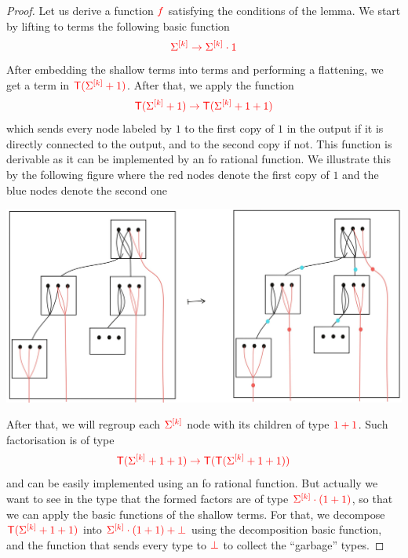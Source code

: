 \begin{proof}
Let us derive a function ${\color{red}{f}}$ satisfying the conditions of the lemma. We start by lifting to terms the following basic function 
\begin{align*}
{\color{red}{\Sigma^{{\color{red}{[k]}}}  \to \Sigma^{{\color{red}{[k]}}} \cdot1}}
\end{align*}
After embedding the shallow terms into terms and performing a flattening, we get a term in ${\color{red}{{\color{red}{\mathsf T}}(\Sigma^{{\color{red}{[k]}}}+1)}}$. After that, we apply the function
\begin{align*}
{\color{red}{{\color{red}{\mathsf T}}(\Sigma^{{\color{red}{[k]}}}+1)\to {\color{red}{\mathsf T}}(\Sigma^{{\color{red}{[k]}}}+1+1)}}
\end{align*}
which sends every node labeled by $1$ to the first copy of $1$ in the output if it is directly connected to the output, and to the second copy if not. This function is derivable as it can be implemented by an fo rational function. We illustrate this by the following figure where the red nodes denote the first copy of $1$ and the blue nodes denote the second one
\begin{center}
\includegraphics[scale=.1]{MyPicLabel1.jpg}
\end{center}  
After that, we will regroup each ${\color{red}{\Sigma^{{\color{red}{[k]}}}}}$ node with its children of type ${\color{red}{1+1}}$. Such factorisation is of type
\begin{align*}
{\color{red}{{\color{red}{\mathsf T}}(\Sigma^{{\color{red}{[k]}}}+1+1)\to {\color{red}{\mathsf T}}({\color{red}{\mathsf T}}(\Sigma^{{\color{red}{[k]}}}+1+1))}}
\end{align*} 
and can be easily implemented using an fo rational function.
But actually we want to see in the type that the formed factors are of type ${\color{red}{\Sigma^{{\color{red}{[k]}}}\cdot(1+1)}}$, so that we can apply the basic functions of the shallow terms. For that, we decompose ${\color{red}{{\color{red}{\mathsf T}}(\Sigma^{{\color{red}{[k]}}}+1+1)}}$ into ${\color{red}{\Sigma^{{\color{red}{[k]}}}\cdot(1+1)+\bot}}$ using the decomposition basic function, and the function 
that sends every type to ${\color{red}{\bot}}$ to collect the ``garbage'' types.

\end{proof}
